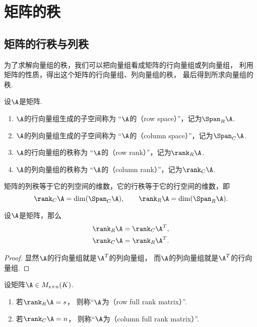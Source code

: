 \section{矩阵的秩}
\subsection{矩阵的行秩与列秩}
为了求解向量组的秩，我们可以把向量组看成矩阵的行向量组或列向量组，
利用矩阵的性质，得出这个矩阵的行向量组、列向量组的秩，
最后得到所求向量组的秩.

\begin{definition}\label{definition:线性方程组.行秩与列秩的定义}
设\(\A\)是矩阵.
\begin{enumerate}
	\item \(\A\)的行向量组生成的子空间称为
	“\(\A\)的（row space）”，记为\(\Span_R\A\).
	\item \(\A\)的列向量组生成的子空间称为
	“\(\A\)的（column space）”，记为\(\Span_C\A\).
	\item \(\A\)的行向量组的秩称为
	“\(\A\)的（row rank）”，记为\(\rank_R\A\).
	\item \(\A\)的列向量组的秩称为
	“\(\A\)的（column rank）”，记为\(\rank_C\A\).
\end{enumerate}
\end{definition}

矩阵的列秩等于它的列空间的维数，它的行秩等于它的行空间的维数，即\[
	\rank_C\A=\dim(\Span_C\A), \qquad
	\rank_R\A=\dim(\Span_R\A).
\]

\begin{proposition}\label{theorem:向量空间.矩阵的行秩与列秩分别等于它的转置矩阵的列秩与行秩}
设\(\A\)是矩阵，那么\begin{gather}
	\rank_R\A=\rank_C\A^T, \\
	\rank_C\A=\rank_R\A^T.
\end{gather}
\begin{proof}
显然\(\A\)的行向量组就是\(\A^T\)的列向量组，
而\(\A\)的列向量组就是\(\A^T\)的行向量组.
\end{proof}
\end{proposition}

\begin{definition}
设矩阵\(\A \in M_{s \times n}(K)\).
\begin{enumerate}
	\item 若\(\rank_R\A = s\)，
	则称“\(\A\)为（row full rank matrix）”.
	\item 若\(\rank_C\A = n\)，
	则称“\(\A\)为（column full rank matrix）”.
\end{enumerate}
\end{definition}

